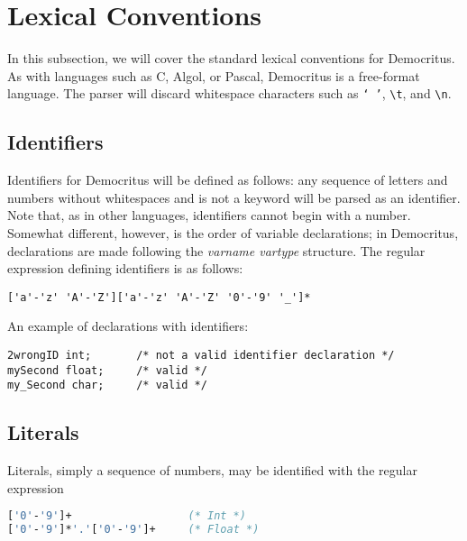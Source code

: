 \section{Lexical Conventions}
	In this subsection, we will cover the standard lexical conventions for Democritus. As with languages such as C, Algol, or Pascal, Democritus is a free-format language. The parser will discard whitespace characters such as \texttt{` '}, \texttt{\textbackslash t}, and \texttt{\textbackslash n}.
	
	\subsection{Identifiers}
		Identifiers for Democritus will be defined as follows: any sequence of letters and numbers without whitespaces and is not a keyword will be parsed as an identifier. Note that, as in other languages, identifiers cannot begin with a number. Somewhat different, however, is the order of variable declarations; in Democritus, declarations are made following the \textit{varname vartype} structure. The regular expression defining identifiers is as follows:
		
	\begin{lstlisting}
['a'-'z' 'A'-'Z']['a'-'z' 'A'-'Z' '0'-'9' '_']*
	\end{lstlisting}
	
	\noindent An example of declarations with identifiers: 
	
	\begin{lstlisting}
2wrongID int;		/* not a valid identifier declaration */
mySecond float;		/* valid */
my_Second char;		/* valid */
	\end{lstlisting}
	
	\subsection{Literals}
		Literals, simply a sequence of numbers, may be identified with the regular expression
	\begin{lstlisting}[language=Caml]
['0'-'9']+ 					(* Int *)
['0'-'9']*'.'['0'-'9']+  	(* Float *)
	\end{lstlisting}
	
